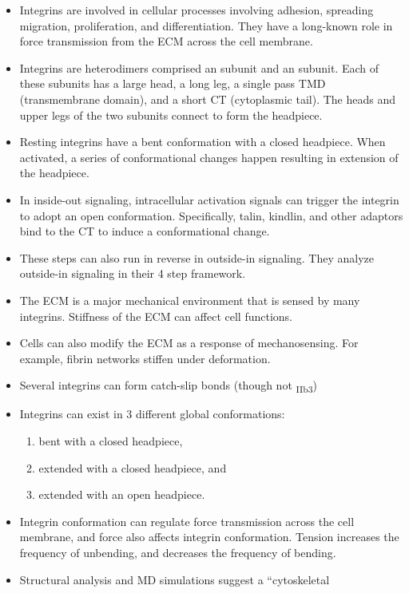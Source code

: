 \documentclass[
10pt, %
letterpaper, %
twocolumn, %
landscape %
]{article}
\newcommand{\inta}[1]{\textalpha\textsubscript{#1}}
\newcommand{\intb}[1]{\textbeta\textsubscript{#1}}
\begin{document}
\begin{itemize}
\item Integrins are involved in cellular processes involving adhesion,
  spreading migration, proliferation, and differentiation. They have a
  long-known role in force transmission from the ECM across the cell
  membrane. 
\item Integrins are heterodimers comprised an \inta{} subunit and an
  \intb{} subunit. Each of these subunits has a large head, a long
  leg, a single pass TMD (transmembrane domain), and a short CT
  (cytoplasmic tail). The heads and upper legs of the two subunits
  connect to form the headpiece.
\item Resting integrins have a bent conformation with a closed
  headpiece. When activated, a series of conformational changes happen
  resulting in extension of the headpiece.
\item In inside-out signaling, intracellular activation signals can
  trigger the integrin to adopt an open conformation. Specifically,
  talin, kindlin, and other adaptors bind to the \intb{}CT to induce a
  conformational change. 
\item These steps can also run in reverse in outside-in
  signaling. They analyze outside-in signaling in their 4 step
  framework. 
\item The ECM is a major mechanical environment that is sensed by many
  integrins. Stiffness of the ECM can affect cell functions.
\item Cells can also modify the ECM as a response of
  mechanosensing. For example, fibrin networks stiffen under
  deformation. 
\item Several integrins can form catch-slip bonds (though not
  \inta{IIb}\intb{3}) 
\item Integrins can exist in 3 different global conformations:
  \begin{enumerate}
  \item bent with a closed headpiece, 
  \item extended with a closed headpiece, and 
  \item extended with an open headpiece.
  \end{enumerate}
\item Integrin conformation can regulate force transmission across the
  cell membrane, and force also affects integrin conformation. Tension
  increases the frequency of unbending, and decreases the frequency of
  bending. 
\item Structural analysis and MD simulations suggest a ``cytoskeletal

\end{itemize}
\end{document}
